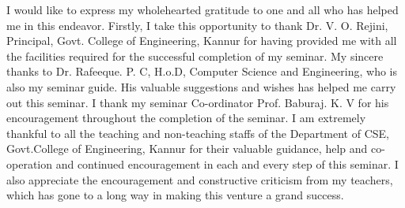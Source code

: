 I would like to express my wholehearted gratitude to one and all who has
helped me in this endeavor. Firstly, I take this opportunity to thank Dr. V.
O. Rejini, Principal, Govt. College of Engineering, Kannur for having
provided me with all the facilities required for the successful completion of my
seminar. My sincere thanks to Dr. Rafeeque. P. C, H.o.D, Computer Science
and Engineering, who is also my seminar guide. His valuable suggestions and wishes has helped me carry out this seminar. I
thank my seminar Co-ordinator Prof. Baburaj. K. V for his encouragement
throughout the completion of the seminar. I am extremely thankful to all the
teaching and non-teaching staffs of the Department of CSE, Govt.College of
Engineering, Kannur for their valuable guidance, help and co-operation and
continued encouragement in each and every step of this seminar. I also appreciate the encouragement and constructive criticism from my teachers, which
has gone to a long way in making this venture a grand success.
